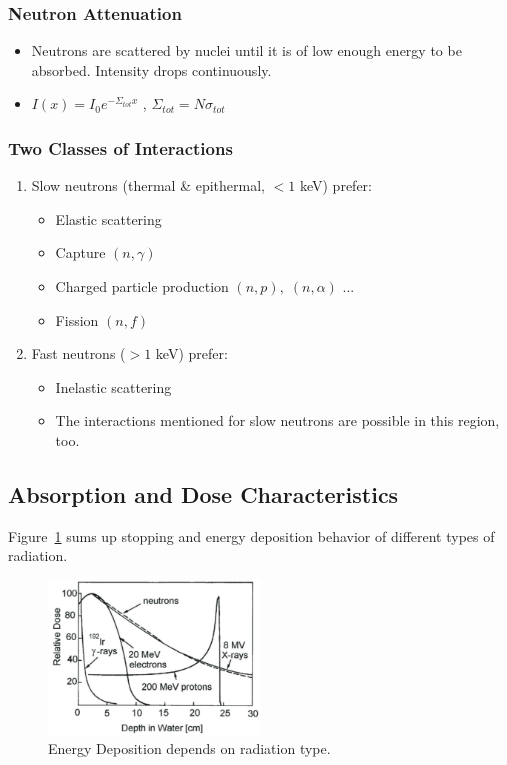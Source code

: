 \subsubsection{Neutron Attenuation}
\begin{itemize}
    \item Neutrons are scattered by nuclei until it is of low enough energy to be absorbed. Intensity drops continuously.
    \item $I(x)=I_0e^{-\Sigma_{tot}x}$ , $\Sigma_{tot}=N\sigma_{tot}$
\end{itemize}
\subsubsection{Two Classes of Interactions}
\begin{enumerate}
    \item Slow neutrons (thermal \& epithermal, $<1$ keV) prefer:
    \begin{itemize}
        \item Elastic scattering
        \item Capture $(n,\gamma)$
        \item Charged particle production $(n,p),\;(n,\alpha)$ ...
        \item Fission $(n,f)$
    \end{itemize}
    \item Fast neutrons ($>1$ keV) prefer:
    \begin{itemize}
        \item Inelastic scattering
        \item The interactions mentioned for slow neutrons are possible in this region, too.
    \end{itemize}
\end{enumerate}
\subsection{Absorption and Dose Characteristics}
Figure~\ref{fig:dose_of_diff_radiation} sums up stopping and energy deposition behavior of different types of radiation. 
\begin{figure}[ht]
    \centering
    \includegraphics[width=0.5\textwidth]{images/dose_of_diff_radiation.png}
    \caption{Energy Deposition depends on radiation type.}
    \label{fig:dose_of_diff_radiation}
\end{figure}
